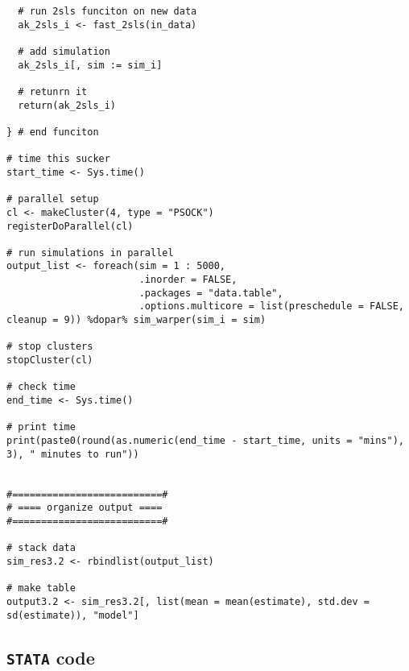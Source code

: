 \documentclass[12pt]{article}
\begin{document}
\begin{verbatim}
  # run 2sls funciton on new data 
  ak_2sls_i <- fast_2sls(in_data)
  
  # add simulation 
  ak_2sls_i[, sim := sim_i]
  
  # retunrn it 
  return(ak_2sls_i)
  
} # end funciton 

# time this sucker 
start_time <- Sys.time()

# parallel setup
cl <- makeCluster(4, type = "PSOCK")
registerDoParallel(cl)

# run simulations in parallel
output_list <- foreach(sim = 1 : 5000,
                       .inorder = FALSE,
                       .packages = "data.table",
                       .options.multicore = list(preschedule = FALSE, cleanup = 9)) %dopar% sim_warper(sim_i = sim)

# stop clusters 
stopCluster(cl)

# check time 
end_time <- Sys.time()

# print time 
print(paste0(round(as.numeric(end_time - start_time, units = "mins"), 3), " minutes to run"))


#==========================#
# ==== organize output ====
#==========================#

# stack data 
sim_res3.2 <- rbindlist(output_list)

# make table 
output3.2 <- sim_res3.2[, list(mean = mean(estimate), std.dev = sd(estimate)), "model"]

\end{verbatim}

\subsection{\texttt{STATA} code}
\end{document}
